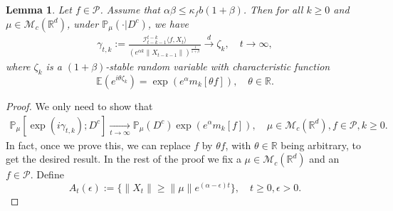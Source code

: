 \documentclass[12pt]{amsart}
\theoremstyle{plain}
\newtheorem{lem}[thm]{Lemma}
\theoremstyle{definition}
\numberwithin{equation}{section}
\begin{document}
\begin{lem}\label{lem: mainlemma}
Let $f\in \mathcal{P}$.
Assume that $\alpha\beta\leq \kappa_fb(1+\beta)$.
Then for all $k\geq 0$ and $\mu \in \mathcal{M}_c(\mathbb{R}^d)$, under $\mathbb{P}_{\mu}(\cdot | D ^c)$, we have
 \begin{align}
      \gamma_{t,k}:=\frac{\mathcal I_{t-k-1}^{t-k}\langle f ,X_t\rangle}{(e^{\alpha k}\|X_{t-k-1}\|)^{\frac{1}{1+\beta}}}\xrightarrow{d}\zeta_k, \quad t\rightarrow \infty, \label{limitdistribution1}
 \end{align}
 where $\zeta_k$ is a $(1+\beta)$-stable random variable with characteristic function
 $$\mathbb{E}(e^{i\theta\zeta_k})=\exp(e^{\alpha}m_k[\theta f]),\quad \theta \in \mathbb R.$$
 \end{lem}
 \begin{proof}
	We only need to show that
\begin{align}
    \mathbb{P}_{\mu}[\exp(i\gamma_{t,k}); D^c]
    \xrightarrow[t\rightarrow \infty]{}\mathbb{P}_{\mu}(D^c)\exp(e^{\alpha}m_k[f]),
    \quad \mu \in \mathcal M_c(\mathbb R^d), f\in \mathcal P, k \geq 0.
\end{align}
	In fact, once we prove this, we can replace $f$ by $\theta f$, with $\theta \in \mathbb R$ being  arbitrary,  to get the desired result.
	In the rest of the proof we fix a $\mu \in \mathcal M_c(\mathbb R^d)$ and an $f\in \mathcal P$.
	Define 
\[
	A_t(\epsilon):=\{ \|X_t\| \geq \|\mu\|e^{(\alpha - \epsilon)t} \},\quad t\geq 0, \epsilon > 0.
\]
	

\end{proof}
\end{document}
